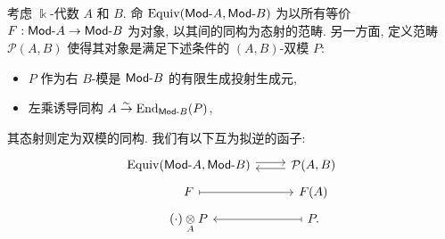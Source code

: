\begin{theorem}[森田纪一]\label{prop:Morita-refined}
	考虑 $\Bbbk$-代数 $A$ 和 $B$. 命 $\mathrm{Equiv}(\mathsf{Mod}\text{-}A, \mathsf{Mod}\text{-}B)$ 为以所有等价 $F: \mathsf{Mod}\text{-}A \to \mathsf{Mod}\text{-}B$ 为对象, 以其间的同构为态射的范畴. 另一方面, 定义范畴 $\mathcal{P}(A, B)$ 使得其对象是满足下述条件的 $(A, B)$-双模 $P$:
	\begin{itemize}
		\item $P$ 作为右 $B$-模是 $\mathsf{Mod}\text{-}B$ 的有限生成投射生成元,
		\item 左乘诱导同构 $A \stackrel{\sim}{\rightarrow} \operatorname{End}_{\mathsf{Mod}\text{-}B}(P)$,
	\end{itemize}
	其态射则定为双模的同构. 我们有以下互为拟逆的函子:
	\[\begin{tikzcd}[row sep=tiny]
		\mathrm{Equiv}(\cated{Mod}A, \cated{Mod}B) \arrow[shift left, r] & \mathcal{P}(A, B) \arrow[shift left, l] \\
		F \arrow[mapsto, r] & F(A) \\
		(\cdot) \dotimes{A} P & P \arrow[mapsto, l] .
	\end{tikzcd}\]
\end{theorem}
